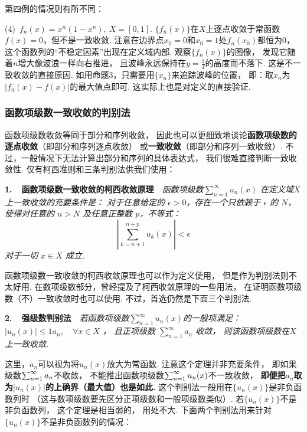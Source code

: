 第四例的情况则有所不同：\vspace{0.5em}

(4)~$f_n(x) = x^n (1-x^n),~X = [0,1]$.
$\{ f_n (x)\} $在$X$上逐点收敛于常函数$f(x) = 0$，但不是一致收敛.
注意在边界点$x_0 = 0$和$x_0 = 1$处$f_n(x_0)$都恒为$0$，
这个函数列的“不稳定因素”出现在定义域内部.
观察$\{ f_n(x) \}$的图像，
发现它随着$n$增大像波浪一样向右推进，
且波峰永远保持在$y = \frac{1}{4}$的高度而不落下.
这是不一致收敛的直接原因.
如用命题3，只需要用$\{ x_n \}$来追踪波峰的位置，
即：取$x_n$为$|f_n(x) - f(x)|$的最大值点即可.
这实际上也是对定义的直接验证.

\subsubsection{函数项级数一致收敛的判别法}

函数项级数收敛等同于部分和序列收敛，
因此也可以更细致地谈论\textbf{函数项级数的逐点收敛}（即部分和序列逐点收敛）
或\textbf{一致收敛}（即部分和序列一致收敛）.
不过，一般情况下无法计算出部分和序列的具体表达式，
我们很难直接判断一致收敛性.
仅有柯西准则和三条判别法供我们使用：\vspace{1em}

\textbf{1.~~函数项级数一致收敛的柯西收敛原理}~~\textit{函数项级数$\sum_{n=1}^{\infty} u_n(x)$ 在定义域$X$上一致收敛的充要条件是：
对于任意给定的 \(\epsilon > 0\)，存在一个只依赖于 \(\epsilon\) 的 \( N\)，使得对任意的 \( n > N \) 及任意正整数 \( p \)，不等式：
\[ \left| \sum_{k=n+1}^{n+p} u_k(x) \right| < \epsilon \]
对于一切 \( x \in X \) 成立.} \vspace{1.25em}

函数项级数一致收敛的柯西收敛原理也可以作为定义使用，
但是作为判别法则不太好用.
在数项级数部分，曾经提及了柯西收敛原理的一些用法，
在证明函数项级数（不）一致收敛时也可以使用.
不过，首选仍然是下面三个判别法.\vspace{1.25em}

\textbf{2.~~强级数判别法}~~\textit{若函数项级数$\sum_{n=1}^{\infty} u_n(x)$的一般项满足：
$|u_n(x)| \leq1 a_n, \quad \forall x \in X $ ，
且正项级数 $ \sum_{n=1}^{\infty} a_n $ 收敛，
则该函数项级数在$X$上一致收敛.} \vspace{0.75em}

这里，$a_n$可以视为将$u_n(x)$放大为常函数.
注意这个定理并非充要条件，
即如果级数$\ss a_n$不收敛，
不能推出函数项级数$\ss u_n(x)$不一致收敛，
\textbf{即便把$a_n$取为$|u_n(x)|$的上确界（最大值）也是如此.}
这个判别法一般用在$\{ u_n (x)\}$是非负函数列时
（这与数项级数要先区分正项级数和一般项级数类似）.
若$\{ u_n(x) \}$不是非负函数列，
这个定理是相当弱的，
用处不大.
下面两个判别法用来针对$\{ u_n(x) \}$不是非负函数列的情况：\vspace{1.25em}

